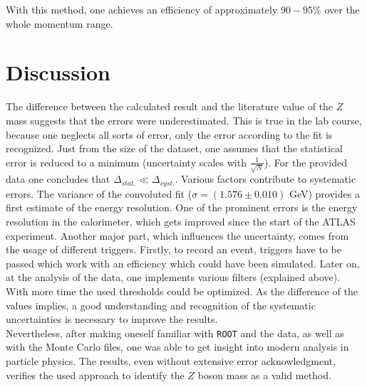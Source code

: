 \documentclass[12pt, a4paper, bibliography=totoc]{scrartcl}
\begin{document}
\begin{multicols}{2}
With this method, one achieves an efficiency of approximately $90-95\%$ over the whole momentum range.

\section{Discussion}
The difference between the calculated result and the literature value of the $Z$ mass suggests that the errors were underestimated.
This is true in the lab course, because one neglects all sorts of error, only the error according to the fit is recognized.
Just from the size of the dataset, one assumes that the statistical error is reduced to a minimum (uncertainty scales with $\frac{1}{\sqrt{N}}$).
For the provided data one concludes that $\Delta_{stat.} \ll \Delta_{syst.}$.
Various factors contribute to systematic errors. 
The variance of the convoluted fit ($\sigma = (1.576 \pm 0.010)$ \si{GeV}) provides a first estimate of the energy resolution.
One of the prominent errors is the energy resolution in the calorimeter, which gets improved since the start of the ATLAS experiment. 
Another major part, which influences the uncertainty, comes from the usage of different triggers.
Firstly, to record an event, triggers have to be passed which work with an efficiency which could have been simulated. 
Later on, at the analysis of the data, one implements various filters (explained above).
With more time the used thresholds could be optimized.
As the difference of the values implies, a good understanding and recognition of the systematic uncertainties is necessary to improve the results.\\

Nevertheless, after making oneself familiar with \verb*+ROOT+ and the data, as well as with the Monte Carlo files, one was able to get insight into modern analysis in particle physics. 
The results, even without extensive error acknowledgment, verifies the used approach to identify the $Z$ boson mass as a valid method.  

\newpage
\nocite{*}
\appendix
\printbibliography
\end{multicols}
\end{document}
